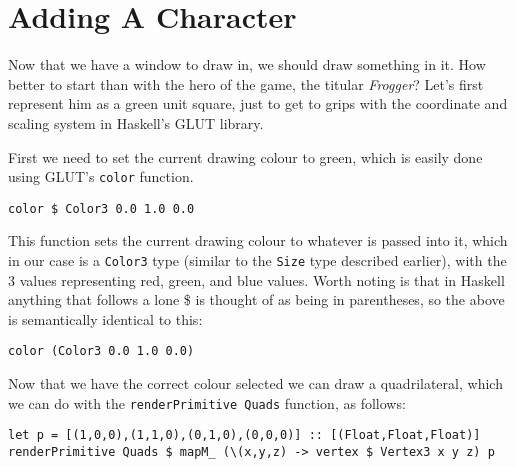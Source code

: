 \documentclass[12pt, a4paper]{report}
\begin{document}
\section{Adding A Character}

Now that we have a window to draw in, we should draw something in it.
How better to start than with the hero of the game, the titular \textit{Frogger}?
Let's first represent him as a green unit square, just to get to grips with the coordinate and scaling system in Haskell's GLUT library.

\par

First we need to set the current drawing colour to green, which is easily done using GLUT's \verb|color| function.

\begin{lstlisting}
color $ Color3 0.0 1.0 0.0
\end{lstlisting}

This function sets the current drawing colour to whatever is passed into it, which in our case is a \verb|Color3| type (similar to the \verb|Size| type described earlier), with the 3 values representing red, green, and blue values.
Worth noting is that in Haskell anything that follows a lone \$ is thought of as being in parentheses, so the above is semantically identical to this:

\begin{lstlisting}
color (Color3 0.0 1.0 0.0)
\end{lstlisting}

Now that we have the correct colour selected we can draw a quadrilateral, which we can do with the \verb|renderPrimitive Quads| function, as follows:

\begin{lstlisting}[xleftmargin=-0.1\textwidth, xrightmargin=-0.1\textwidth]
let p = [(1,0,0),(1,1,0),(0,1,0),(0,0,0)] :: [(Float,Float,Float)]
renderPrimitive Quads $ mapM_ (\(x,y,z) -> vertex $ Vertex3 x y z) p
\end{lstlisting}
\end{document}

